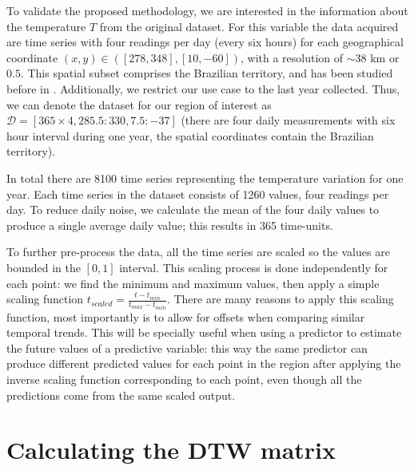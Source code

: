To validate the proposed methodology, we are interested in the information about the temperature $T$ from the original dataset. For this variable the data acquired are time series with four readings per day (every six hours) for each geographical coordinate $(x,y)\in ([278, 348], [10, -60])$, with a resolution of $\sim 38$ km or $0.5$\textdegree. This spatial subset comprises the Brazilian territory, and has been studied before in \cite{Souto2018}. Additionally, we restrict our use case to the last year collected. Thus, we can denote the dataset for our region of interest as $\mathcal{D} = [ 365\times 4, 285.5:330, 7.5:-37]$ (there are four daily measurements with six hour interval during one year, the spatial coordinates contain the Brazilian territory). 

In total there are 8100 time series representing the temperature variation for one year. Each time series in the dataset consists of 1260 values, four readings per day. To reduce daily noise, we calculate the mean of the four daily values to produce a single average daily value; this results in 365 time-units. 

To further pre-process the data, all the time series are scaled so the values are bounded in the $[0, 1]$ interval. This scaling process is done independently for each point: we find the minimum and maximum values, then apply a simple scaling function $ t_{scaled} = \frac{t - t_{min}}{t_{max} - t_{min}}$. There are many reasons to apply this scaling function, most importantly is to allow for offsets when comparing similar temporal trends. This will be specially useful when using a predictor to estimate the future values of a predictive variable: this way the same predictor can produce different predicted values for each point in the region after applying the inverse scaling function corresponding to each point, even though all the predictions come from the same scaled output.

\section{Calculating the DTW matrix}
\label{Sec:Calculating_DTW}

